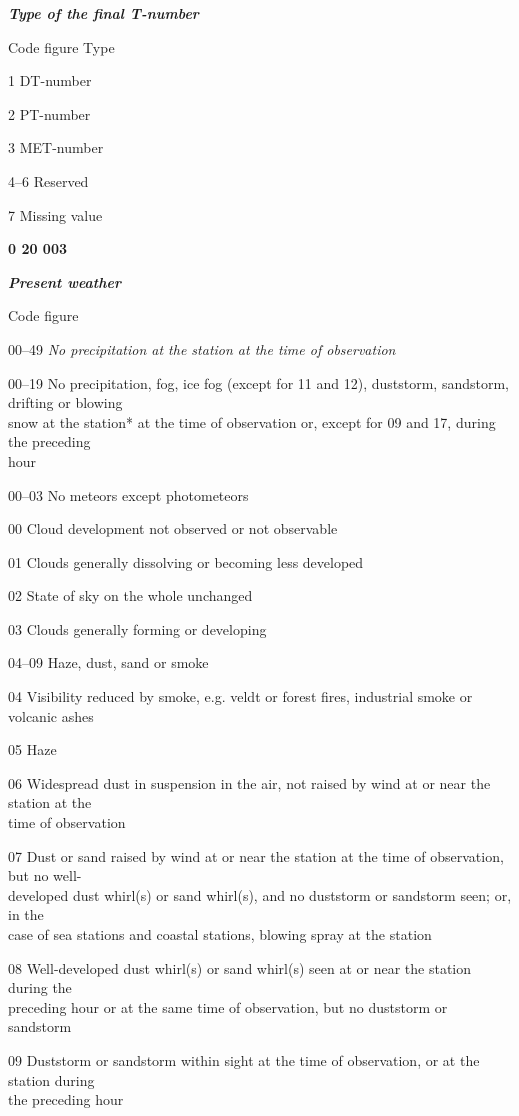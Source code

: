 \emph{\textbf{Type of the final T-number}}

Code figure Type

1 DT-number

2 PT-number

3 MET-number

4--6 Reserved

7 Missing value

\textbf{0 20 003}

\emph{\textbf{Present weather}}

Code figure

00--49 \emph{No precipitation at the station at the time of observation}

00--19 No precipitation, fog, ice fog (except for 11 and 12), duststorm, sandstorm, drifting or blowing\\
snow at the station* at the time of observation or, except for 09 and 17, during the preceding\\
hour

00--03 No meteors except photometeors

00 Cloud development not observed or not observable

01 Clouds generally dissolving or becoming less developed

02 State of sky on the whole unchanged

03 Clouds generally forming or developing

04--09 Haze, dust, sand or smoke

04 Visibility reduced by smoke, e.g. veldt or forest fires, industrial smoke or volcanic ashes

05 Haze

06 Widespread dust in suspension in the air, not raised by wind at or near the station at the\\
time of observation

07 Dust or sand raised by wind at or near the station at the time of observation, but no well-\\
developed dust whirl(s) or sand whirl(s), and no duststorm or sandstorm seen; or, in the\\
case of sea stations and coastal stations, blowing spray at the station

08 Well-developed dust whirl(s) or sand whirl(s) seen at or near the station during the\\
preceding hour or at the same time of observation, but no duststorm or sandstorm

09 Duststorm or sandstorm within sight at the time of observation, or at the station during\\
the preceding hour

